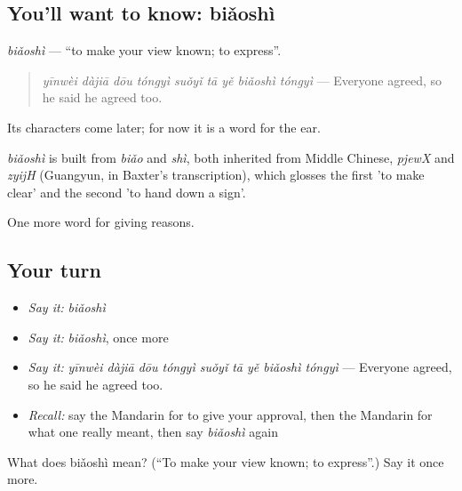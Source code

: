 \subsection*{You'll want to know: biǎoshì}
\emph{biǎoshì} — \textquotedblleft{}to make your view known; to express\textquotedblright{}.

\begin{quote}
\emph{yīnwèi dàjiā dōu tóngyì suǒyǐ tā yě biǎoshì tóngyì} — Everyone agreed, so he said he agreed too.
\end{quote}

Its characters come later; for now it is a word for the ear.

\begin{cousinweb}
\emph{biǎoshì} is built from \emph{biǎo} and \emph{shì}, both inherited from Middle Chinese, \emph{pjewX} and \emph{zyijH} (Guangyun, in Baxter's transcription), which glosses the first 'to make clear' and the second 'to hand down a sign'.
\end{cousinweb}

\begin{grammarlens}[title={What you've built}]
One more word for giving reasons.
\end{grammarlens}

\subsection*{Your turn}
\begin{itemize}
\raggedright
  \item \emph{Say it:} \emph{biǎoshì}
  \item \emph{Say it:} \emph{biǎoshì}, once more
  \item \emph{Say it:} \emph{yīnwèi dàjiā dōu tóngyì suǒyǐ tā yě biǎoshì tóngyì} — Everyone agreed, so he said he agreed too.
  \item \emph{Recall:} say the Mandarin for to give your approval, then the Mandarin for what one really meant, then say \emph{biǎoshì} again
\end{itemize}

\begin{tcolorbox}[breakable,colback=teal!4,colframe=teal!35!black,title={Before you move on}]
What does biǎoshì mean? (\textquotedblleft{}To make your view known; to express\textquotedblright{}.) Say it once more.
\end{tcolorbox}
